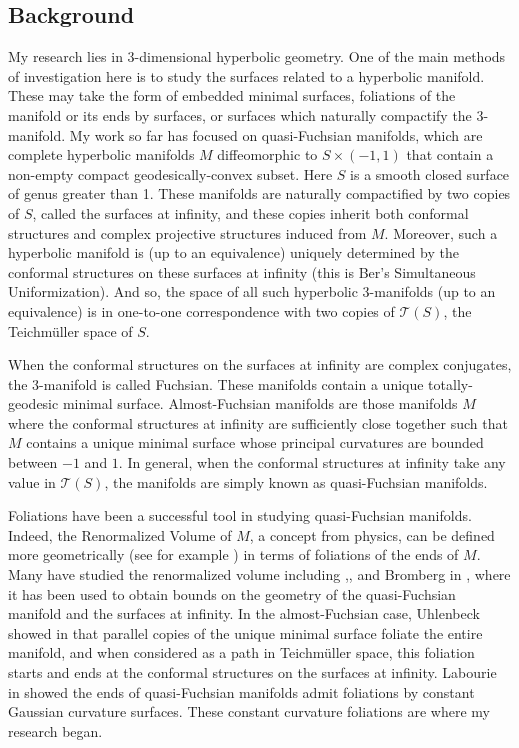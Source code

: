\documentclass[11pt]{amsart}
\begin{document}
\subsection{Background}
My research lies in 3-dimensional hyperbolic geometry. One of the main methods of investigation here is to study the surfaces related to a hyperbolic manifold. These may take the form of embedded minimal surfaces, foliations of the manifold or its ends by surfaces, or surfaces which naturally compactify the 3-manifold. My work so far has focused on quasi-Fuchsian manifolds, which are complete hyperbolic manifolds $M$ diffeomorphic to $S \times (-1,1)$ that contain a non-empty compact geodesically-convex subset. Here $S$ is a smooth closed surface of genus greater than 1. These manifolds are naturally compactified by two copies of $S$, called the surfaces at infinity, and these copies inherit both conformal structures and complex projective structures induced from $M$. Moreover, such a hyperbolic manifold is (up to an equivalence) uniquely determined by the conformal structures on these surfaces at infinity (this is Ber's Simultaneous Uniformization). And so, the space of all such hyperbolic 3-manifolds (up to an equivalence) is in one-to-one correspondence with two copies of $\mathcal{T}(S)$, the Teichm\"uller space of $S$.

When the conformal structures on the surfaces at infinity are complex conjugates, the 3-manifold is called Fuchsian. These manifolds contain a unique totally-geodesic minimal surface. Almost-Fuchsian manifolds are those manifolds $M$ where the conformal structures at infinity are sufficiently close together such that $M$ contains a unique minimal surface whose principal curvatures are bounded between $-1$ and $1$. In general, when the conformal structures at infinity take any value in $\mathcal{T}(S)$, the manifolds are simply known as quasi-Fuchsian manifolds. 

Foliations have been a successful tool in studying quasi-Fuchsian manifolds. Indeed, the Renormalized Volume of $M$, a concept from physics, can be defined more geometrically (see for example \cite{krasnov-schlenker2008}) in terms of foliations of the ends of $M$. Many have studied the renormalized volume including \cite{schlenker2013},\cite{ciobotaru-moroianu2016}, and Bromberg in \cite{bridgeman-brock-bromberg2019}, where it has been used to obtain bounds on the geometry of the quasi-Fuchsian manifold and the surfaces at infinity. In the almost-Fuchsian case, Uhlenbeck showed in \cite{uhlenbeck1983} that parallel copies of the unique minimal surface foliate the entire manifold, and when considered as a path in Teichm\"uller space, this foliation starts and ends at the conformal structures on the surfaces at infinity. Labourie in \cite{labourie1991} showed the ends of quasi-Fuchsian manifolds admit foliations by constant Gaussian curvature surfaces. These constant curvature foliations are where my research began.
\end{document}
